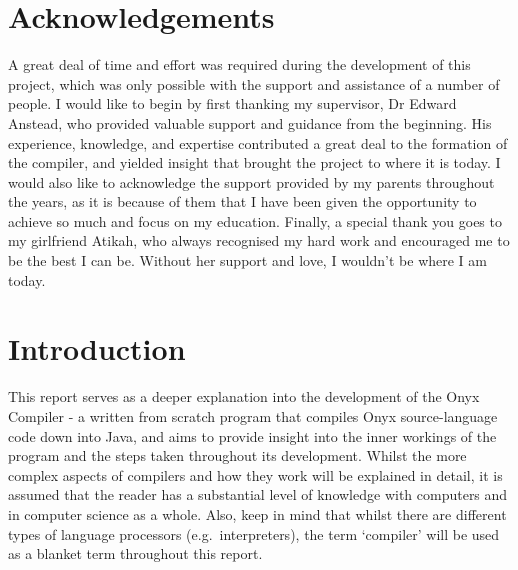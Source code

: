 \documentclass[
]{report}
\begin{document}
\chapter*{Acknowledgements}
A great deal of time and effort was required during the development of
this project, which was only possible with the support and assistance of
a number of people. I would like to begin by first thanking my
supervisor, Dr Edward Anstead, who provided valuable support and
guidance from the beginning. His experience, knowledge, and expertise
contributed a great deal to the formation of the compiler, and yielded
insight that brought the project to where it is today. I would also like
to acknowledge the support provided by my parents throughout the years,
as it is because of them that I have been given the opportunity to
achieve so much and focus on my education. Finally, a special thank you
goes to my girlfriend Atikah, who always recognised my hard work and
encouraged me to be the best I can be. Without her support and love, I
wouldn't be where I am today.

\setcounter{tocdepth}{2}
\tableofcontents

\listoffigures

\chapter{Introduction}
This report serves as a deeper explanation into the development of the
Onyx Compiler - a written from scratch program that compiles Onyx \gls{source-language}
code down into Java, and aims to provide insight into the inner workings
of the program and the steps taken throughout its development. Whilst
the more complex aspects of compilers and how they work will be
explained in detail, it is assumed that the reader has a substantial
level of knowledge with computers and in computer science as a whole.
Also, keep in mind that whilst there are different types of language
processors (e.g.~\glspl{interpreter}), the term `compiler' will be used as a
blanket term throughout this report.
\end{document}
